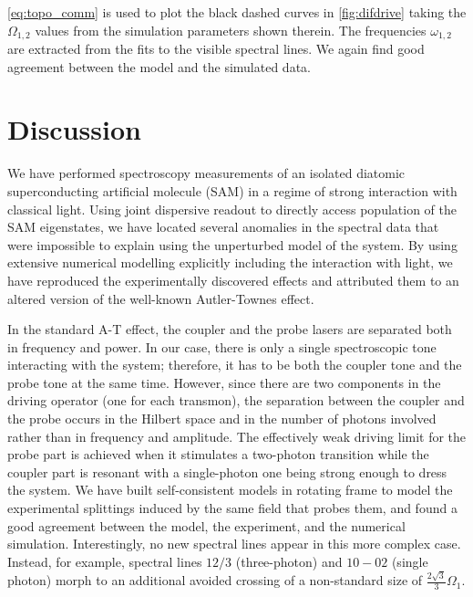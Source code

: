 \documentclass[%
 aps, prx,
 amsmath,amssymb,
 reprint,%
superscriptaddress
]{revtex4-2}
\begin{document}
\autoref{eq:topo_comm} is used to plot the black 
dashed curves in \autoref{fig:difdrive} taking 
the $\Omega_{1,2}$ values from the simulation 
parameters shown therein. The frequencies 
$\omega_{1,2}$ are extracted from the fits to the 
visible spectral lines. We again find good agreement 
between the model and the simulated data.


\section{Discussion}

We have performed spectroscopy measurements of an 
isolated diatomic superconducting artificial 
molecule (SAM) in a regime of strong interaction 
with classical light. Using joint dispersive 
readout to directly access population of the SAM 
eigenstates, we have located several anomalies in 
the spectral data that were impossible to explain 
using the unperturbed model of the system. By 
using extensive numerical modelling explicitly 
including the interaction with light, we have 
reproduced the experimentally discovered effects 
and attributed them to an altered version of the 
well-known Autler-Townes effect.

In the standard A-T effect, the coupler and the 
probe lasers are separated both in frequency and power. 
In our case, there is only a single spectroscopic 
tone interacting with the system; therefore, 
it has to be both the coupler tone and the probe 
tone at the same time. However, since there are 
two components in the driving operator (one for 
each transmon), the separation between the 
coupler and the probe occurs in the Hilbert space and in the number of photons involved 
rather than in frequency and amplitude. The 
effectively weak driving limit for the probe part is 
achieved when it stimulates a two-photon 
transition while the coupler part is resonant 
with a single-photon one being strong enough to dress the 
system. We have built self-consistent models in 
rotating frame to 
model the experimental splittings induced by the 
same field that probes them, and found a good 
agreement between the model, the experiment, and 
the numerical simulation. Interestingly, no new spectral lines appear in this 
more complex case. Instead, for example, spectral 
lines $12/3$ (three-photon) and $10-02$ (single 
photon) morph to an additional avoided crossing of a 
non-standard size of $\frac{2\sqrt{3}}{3} 
\Omega_1$.
\end{document}
